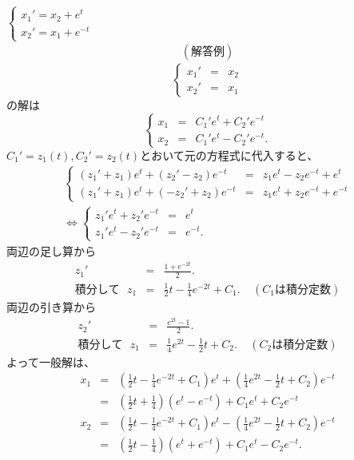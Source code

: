 \documentclass[a4paper,11pt,fleqn]{jarticle}
\begin{document}
\subsubsection{}
$\left\{ \begin{array}{l}
x_1'=x_2+e^t \\
x_2'=x_1+e^{-t}
\end{array} \right.$
\begin{eqnarray*}
(解答例)
\end{eqnarray*}
\[
\left\{
\begin{array}{rcl}
x_1' &=& x_2 \\
x_2' &=& x_1
\end{array}
\right.
\]
の解は
\[
\left\{
\begin{array}{rcl}
x_1 &=& C_1'e^t+C_2'e^{-t} \\
x_2 &=& C_1'e^t-C_2'e^{-t}.
\end{array}
\right.
\]
$C_1'=z_1(t),C_2'=z_2(t)$とおいて元の方程式に代入すると、
\begin{eqnarray*}
\left\{
\begin{array}{rcl}
(z_1'+z_1)e^t+(z_2'-z_2)e^{-t} &=& z_1e^t-z_2e^{-t}+e^t \\
(z_1'+z_1)e^t+(-z_2'+z_2)e^{-t} &=& z_1e^t+z_2e^{-t}+e^{-t}
\end{array}
\right. \\
\Leftrightarrow \left\{
\begin{array}{rcl}
z_1'e^t+z_2'e^{-t} &=& e^t \\
z_1'e^t-z_2'e^{-t} &=& e^{-t}. \hspace{3cm}
\end{array}
\right.
\end{eqnarray*}
両辺の足し算から
\begin{eqnarray*}
z_1' &=& \frac{1+e^{-2t}}2. \\
積分して\ \ \ z_1 &=& \frac12t-\frac14e^{-2t}+C_1. \ \ \ \ \ (C_1は積分定数)
\end{eqnarray*}
両辺の引き算から
\begin{eqnarray*}
z_2' &=& \frac{e^{2t}-1}2. \\
積分して\ \ \ z_1 &=& \frac14e^{2t}-\frac12t+C_2. \ \ \ \ \ (C_2は積分定数)
\end{eqnarray*}
よって一般解は、
\begin{eqnarray*}
x_1 &=& \left(\frac12t-\frac14e^{-2t}+C_1\right)e^t+\left(\frac14e^{2t}-\frac12t+C_2\right)e^{-t} \\
&=& \left(\frac12t+\frac14\right)(e^t-e^{-t})+C_1e^t+C_2e^{-t} \\
x_2 &=& \left(\frac12t-\frac14e^{-2t}+C_1\right)e^t-\left(\frac14e^{2t}-\frac12t+C_2\right)e^{-t} \\
&=& \left(\frac12t-\frac14\right)(e^t+e^{-t})+C_1e^t-C_2e^{-t}.
\end{eqnarray*}
\end{document}
